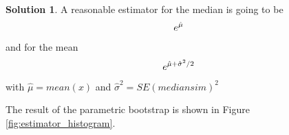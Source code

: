 \documentclass[a4paper, fleqn]{amsart}
\theoremstyle{definition}
\newtheorem{sltn}{Solution}
\begin{document}
\begin{sltn}
A reasonable estimator for the median is going to be
\begin{equation}
  \notag
  e^{\hat{\mu}}
\end{equation} and
for the mean
\begin{equation}
  \notag
e^{\hat{\mu} + \hat{\sigma}^2 / 2}
\end{equation}
with $\hat{\mu} = mean(x)$ and $\hat{\sigma}^2 = SE(mediansim)^2$
\end{sltn}
The result of the parametric bootstrap is shown in Figure \ref{fig:estimator_histogram}.
\inputminted{matlab}{~/Documents/MATLAB/STK_Oblig2.m}
\end{document}
